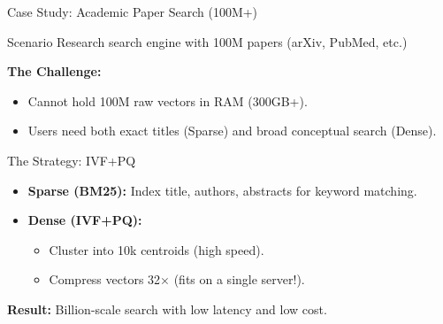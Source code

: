 \documentclass[aspectratio=169]{beamer}
\begin{document}
\begin{frame}[shrink=10]{Case Study: Academic Paper Search (100M+)}
\begin{exampleblock}{Scenario}
Research search engine with 100M papers (arXiv, PubMed, etc.)
\end{exampleblock}

\textbf{The Challenge:}
\begin{itemize}
    \item Cannot hold 100M raw vectors in RAM (300GB+).
    \item Users need both exact titles (Sparse) and broad conceptual search (Dense).
\end{itemize}

\begin{block}{The Strategy: IVF+PQ}
\begin{itemize}
    \item \textbf{Sparse (BM25):} Index title, authors, abstracts for keyword matching.
    \item \textbf{Dense (IVF+PQ):} 
        \begin{itemize}
            \item Cluster into 10k centroids (high speed).
            \item Compress vectors 32$\times$ (fits on a single server!).
        \end{itemize}
\end{itemize}
\end{block}

\textbf{Result:} Billion-scale search with low latency and low cost.
\end{frame}

\end{document}
